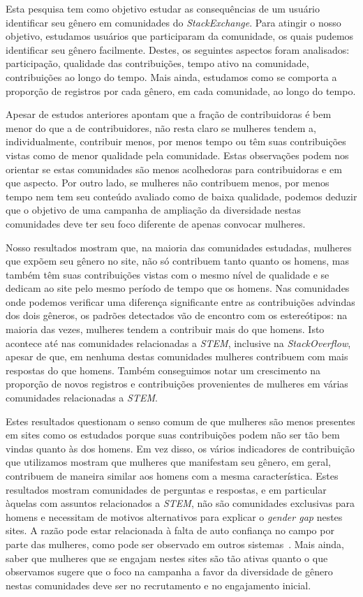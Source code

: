 Esta pesquisa tem como objetivo estudar as consequências de um usuário identificar seu gênero em comunidades do \emph{StackExchange}. Para atingir o nosso objetivo, estudamos usuários que participaram da comunidade, os quais pudemos identificar seu gênero facilmente. Destes, os seguintes aspectos foram analisados: participação, qualidade das contribuições, tempo ativo na comunidade, contribuições ao longo do tempo. Mais ainda, estudamos como se comporta a proporção de registros por cada gênero, em cada comunidade, ao longo do tempo.

Apesar de estudos anteriores apontam que a fração de contribuidoras é bem menor do que a de contribuidores, não resta claro se mulheres tendem a, individualmente, contribuir menos, por menos tempo ou têm suas contribuições vistas como de menor qualidade pela comunidade. Estas observações podem nos orientar se estas comunidades são menos acolhedoras para contribuidoras e em que aspecto. Por outro lado, se mulheres não contribuem menos, por menos tempo nem tem seu conteúdo avaliado como de baixa qualidade, podemos deduzir que o objetivo de uma campanha de ampliação da diversidade nestas comunidades deve ter seu foco diferente de apenas convocar mulheres.

Nosso resultados mostram que, na maioria das comunidades estudadas, mulheres que expõem seu gênero no site, não só contribuem tanto quanto os homens, mas também têm suas contribuições vistas com o mesmo nível de qualidade e se dedicam ao site pelo mesmo período de tempo que os homens. Nas comunidades onde podemos verificar uma diferença significante entre as contribuições advindas dos dois gêneros, os padrões detectados vão de encontro com os estereótipos: na maioria das vezes, mulheres tendem a contribuir mais do que homens. Isto acontece até nas comunidades relacionadas a \emph{STEM}, inclusive na \emph{StackOverflow}, apesar de que, em nenhuma destas comunidades mulheres contribuem com mais respostas do que homens. Também conseguimos notar um crescimento na proporção de novos registros e contribuições provenientes de mulheres em várias comunidades relacionadas a \emph{STEM}.

Estes resultados questionam o senso comum de que mulheres são menos presentes em sites como os estudados porque suas contribuições podem não ser tão bem vindas quanto às dos homens. Em vez disso, os vários indicadores de contribuição que utilizamos mostram que mulheres que manifestam seu gênero, em geral, contribuem de maneira similar aos homens com a mesma característica. Estes resultados mostram comunidades de perguntas e respostas, e em particular àquelas com assuntos relacionados a \emph{STEM}, não são comunidades exclusivas para homens e necessitam de motivos alternativos para explicar o \textit{gender gap} nestes sites. A razão pode estar relacionada à falta de auto confiança no campo por parte das mulheres, como pode ser observado em outros sistemas~\cite{piazza:report}. Mais ainda, saber que mulheres que se engajam nestes sites são tão ativas quanto o que observamos sugere que o foco na campanha a favor da diversidade de gênero nestas comunidades deve ser no recrutamento e no engajamento inicial.


